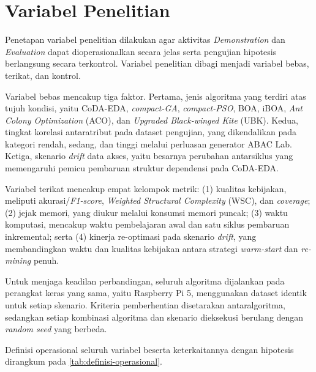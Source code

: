 \section{Variabel Penelitian}

Penetapan variabel penelitian dilakukan agar aktivitas \textit{Demonstration} dan \textit{Evaluation} dapat dioperasionalkan secara jelas serta pengujian hipotesis berlangsung secara terkontrol. 
Variabel penelitian dibagi menjadi variabel bebas, terikat, dan kontrol.

Variabel bebas mencakup tiga faktor. 
Pertama, jenis algoritma yang terdiri atas tujuh kondisi, yaitu CoDA-EDA, \textit{compact-GA}, \textit{compact-PSO}, BOA, iBOA, \textit{Ant Colony Optimization} (ACO), dan \textit{Upgraded Black-winged Kite} (UBK). 
Kedua, tingkat korelasi antaratribut pada dataset pengujian, yang dikendalikan pada kategori rendah, sedang, dan tinggi melalui perluasan generator ABAC Lab. 
Ketiga, skenario \textit{drift} data akses, yaitu besarnya perubahan antarsiklus yang memengaruhi pemicu pembaruan struktur dependensi pada CoDA-EDA.

Variabel terikat mencakup empat kelompok metrik: (1) kualitas kebijakan, meliputi akurasi/\textit{F1-score}, \textit{Weighted Structural Complexity} (WSC), dan \textit{coverage}; (2) jejak memori, yang diukur melalui konsumsi memori puncak; (3) waktu komputasi, mencakup waktu pembelajaran awal dan satu siklus pembaruan inkremental; serta (4) kinerja re-optimasi pada skenario \textit{drift}, yang membandingkan waktu dan kualitas kebijakan antara strategi \textit{warm-start} dan \textit{re-mining} penuh.

Untuk menjaga keadilan perbandingan, seluruh algoritma dijalankan pada perangkat keras yang sama, yaitu Raspberry Pi 5, menggunakan dataset identik untuk setiap skenario. 
Kriteria pemberhentian disetarakan antaralgoritma, sedangkan setiap kombinasi algoritma dan skenario dieksekusi berulang dengan \textit{random seed} yang berbeda.

Definisi operasional seluruh variabel beserta keterkaitannya dengan hipotesis dirangkum pada \ref{tab:definisi-operasional}.

